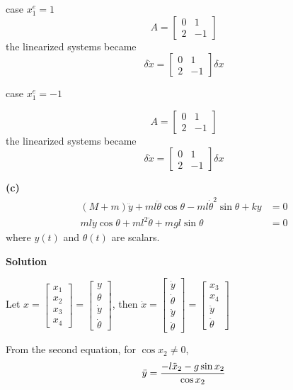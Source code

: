 \documentclass[12pt,a4paper]{article}
\begin{document}
case $x_1^e = 1$
\[
A = \begin{bmatrix}
	0 & 1 \\ 2 & -1
\end{bmatrix}
\]
the linearized systems became
\[
\delta \dot x = \begin{bmatrix}
	0 & 1 \\ 2 & -1
\end{bmatrix} \delta x
\]

case $x_1^e = -1$

\[
A = \begin{bmatrix}
	0 & 1 \\ 2 & -1
\end{bmatrix}
\]
the linearized systems became
\[
\delta \dot x = \begin{bmatrix}
	0 & 1 \\ 2 & -1
\end{bmatrix} \delta x
\]

\textbf{(c)}
\[
\begin{aligned}
(M+m)\ddot y+ml\ddot\theta\cos\theta-ml\dot\theta^2\sin\theta+ky &= 0\\
ml\ddot y\cos\theta+ml^2\ddot\theta+mgl\sin\theta &= 0
\end{aligned}
\]
where $y(t)$ and $\theta(t)$ are scalars.

\textbf{Solution}

Let $ x = 
\begin{bmatrix}
	x_1 \\ x_2 \\ x_3 \\ x_4
\end{bmatrix}
=\begin{bmatrix}
	y \\ \theta \\ \dot y \\ \dot \theta
\end{bmatrix}$, then $
\dot x = \begin{bmatrix}
	\dot y \\ \dot \theta \\  \ddot y \\ \ddot \theta
\end{bmatrix} = \begin{bmatrix}
x_3 \\ x_4 \\ \ddot y \\ \ddot \theta
\end{bmatrix}
$

From the second equation, for $\cos x_2 \neq 0$,
\[
\ddot y = { -l\ddot x_2  -g\sin x_2 \over \cos x_2}
\]
\end{document}
